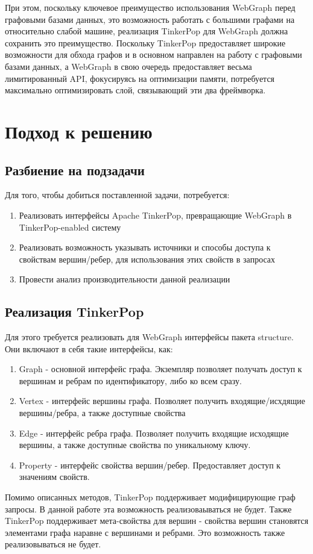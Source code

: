 \documentclass[times,specification,annotation]{itmo-student-thesis}
\begin{document}
При этом, поскольку ключевое преимущество использования WebGraph перед графовыми базами данных, это возможность работать с большими графами на относительно слабой машине, реализация TinkerPop для WebGraph должна сохранить это преимущество. Поскольку TinkerPop предоставляет широкие возможности для обхода графов и в основном направлен на работу с графовыми базами данных, а WebGraph в свою очередь предоставляет весьма лимитированный API, фокусируясь на оптимизации памяти, потребуется максимально оптимизировать слой, связывающий эти два фреймворка.

\chapter{Подход к решению}

\section{Разбиение на подзадачи}

Для того, чтобы добиться поставленной задачи, потребуется:

\begin{enumerate}
    \item Реализовать интерфейсы Apache TinkerPop, превращающие WebGraph в TinkerPop-enabled систему
    \item Реализовать возможность указывать источники и способы доступа к свойствам вершин/ребер, для использования этих свойств в запросах
    \item Провести анализ производительности данной реализации
\end{enumerate}

\section{Реализация TinkerPop}

Для этого требуется реализовать для WebGraph интерфейсы пакета structure. Они включают в себя такие интерфейсы, как:
\begin{enumerate}
    \item Graph - основной интерфейс графа. Экземпляр позволяет получать доступ к вершинам и ребрам по идентификатору, либо ко всем сразу.
    \item Vertex - интерфейс вершины графа. Позволяет получить входящие/исхдящие вершины/ребра, а также доступные свойства
    \item Edge - интерфейс ребра графа. Позволяет получить входящие исходящие вершины, а также доступные свойства по уникальному ключу.
    \item Property - интерфейс свойства вершин/ребер. Предоставляет доступ к значениям свойств.
\end{enumerate}
Помимо описанных методов, TinkerPop поддерживает модифицирующие граф запросы. В данной работе эта возможность реализоваываться не будет. Также TinkerPop поддерживает мета-свойства для вершин - свойства вершин становятся элементами графа наравне с вершинами и ребрами. Это возможность также реализовываться не будет.
\end{document}
